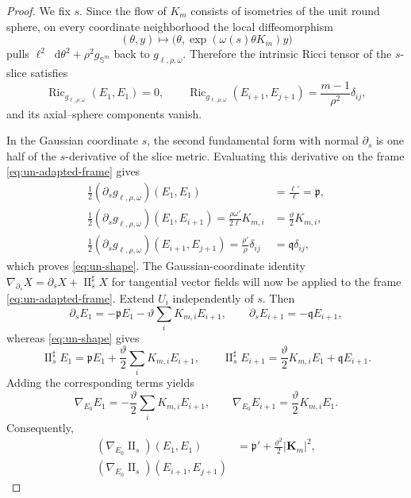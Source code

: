 \documentclass[11pt,reqno]{amsart}
\theoremstyle{definition}
\numberwithin{equation}{section}
\DeclareMathOperator{\Ric}{Ric}
\DeclareMathOperator{\II}{II}
\newcommand{\dd}{\mathop{}\!\mathrm d}
\begin{document}
\begin{proof}
We fix \(s\).  Since the flow of \(K_m\) consists of isometries of the
unit round sphere, on every coordinate neighborhood the local
diffeomorphism
\[
 (\theta,y)\longmapsto
 \bigl(\theta,\exp(\omega(s)\theta K_m)y\bigr)
\]
pulls \(\ell^2\dd\theta^2+\rho^2g_{\mathbb S^m}\) back to
\(g_{\ell,\rho,\omega}\).  Therefore the intrinsic Ricci tensor of the
\(s\)-slice
satisfies
\begin{equation}\label{eq:un-slice-ricci}
 \Ric_{g_{\ell,\rho,\omega}}(E_1,E_1)=0,
 \qquad
 \Ric_{g_{\ell,\rho,\omega}}(E_{i+1},E_{j+1})
 =\frac{m-1}{\rho^2}\delta_{ij},
\end{equation}
and its axial--sphere components vanish.

In the Gaussian coordinate \(s\), the second fundamental form with
normal \(\partial_s\) is one half of the \(s\)-derivative of the slice
metric.  Evaluating this derivative on the frame
\eqref{eq:un-adapted-frame} gives
\begin{align*}
 \frac12(\partial_s g_{\ell,\rho,\omega})(E_1,E_1)
 &=\frac{\ell'}{\ell}=\mathfrak p,\\
 \frac12(\partial_s g_{\ell,\rho,\omega})(E_1,E_{i+1})
 =\frac{\rho\omega'}{2\ell}K_{m,i}
 &=\frac{\vartheta}{2}K_{m,i},\\
 \frac12(\partial_s g_{\ell,\rho,\omega})(E_{i+1},E_{j+1})
 =\frac{\rho'}{\rho}\delta_{ij}
 &=\mathfrak q\delta_{ij},
\end{align*}
which proves \eqref{eq:un-shape}.  The Gaussian-coordinate identity
\(\nabla_{\partial_s}X=\partial_sX+\II_s^\sharp X\) for tangential
vector fields will now be applied to the frame
\eqref{eq:un-adapted-frame}.  Extend \(U_i\) independently of \(s\).
Then
\[
 \partial_sE_1=-\mathfrak p E_1-\vartheta\sum_i K_{m,i}E_{i+1},
 \qquad
 \partial_sE_{i+1}=-\mathfrak q E_{i+1},
\]
whereas \eqref{eq:un-shape} gives
\[
 \II_s^\sharp E_1=\mathfrak p E_1+\frac{\vartheta}{2}
   \sum_i K_{m,i}E_{i+1},
 \qquad
 \II_s^\sharp E_{i+1}
 =\frac{\vartheta}{2}K_{m,i}E_1+\mathfrak q E_{i+1}.
\]
Adding the corresponding terms yields
\begin{equation}\label{eq:un-normal-rotation}
 \nabla_{E_0}E_1=-\frac{\vartheta}{2}\sum_i K_{m,i}E_{i+1},
 \qquad
 \nabla_{E_0}E_{i+1}=\frac{\vartheta}{2}K_{m,i}E_1.
\end{equation}
Consequently,
\begin{align*}
 (\nabla_{E_0}\II_s)(E_1,E_1)
 &=\mathfrak p'+\frac{\vartheta^2}{2}\lvert\mathbf K_m\rvert^2,\\
 (\nabla_{E_0}\II_s)(E_{i+1},E_{j+1})

\end{align*}
\end{proof}
\end{document}
